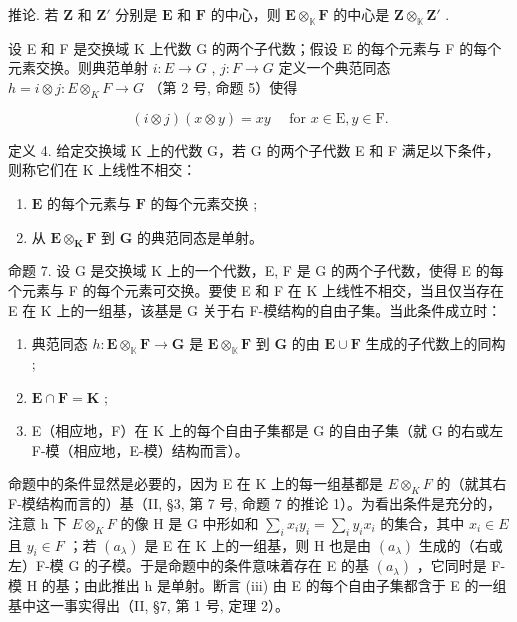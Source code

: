 推论. 若 \(\mathbf{Z}\) 和 \(\mathbf{Z}'\) 分别是 \(\mathbf{E}\) 和 \(\mathbf{F}\) 的中心，则 \(\mathbf{E} \otimes_{\mathbb{K}} \mathbf{F}\) 的中心是 \(\mathbf{Z} \otimes_{\mathbb{K}} \mathbf{Z}'\) .

设 E 和 F 是交换域 K 上代数 G 的两个子代数；假设 E 的每个元素与 F 的每个元素交换。则典范单射 \(i: E \to G\) , \(j: F \to G\) 定义一个典范同态 \(h = i \otimes j: E \otimes_{K} F \to G\) （第 2 号, 命题 5）使得

\[
(i \otimes j) (x \otimes y) = x y \quad \text { for } x \in \mathrm{E}, y \in \mathrm{F}.
\]

定义 4. 给定交换域 K 上的代数 G，若 G 的两个子代数 E 和 F 满足以下条件，则称它们在 K 上线性不相交：

\begin{enumerate}
\def\labelenumi{(\arabic{enumi})}
\item
  \(\mathbf{E}\) 的每个元素与 \(\mathbf{F}\) 的每个元素交换 ;
\item
  从 \(\mathbf{E} \otimes_{\mathbf{K}} \mathbf{F}\) 到 \(\mathbf{G}\) 的典范同态是单射。
\end{enumerate}

命题 7. 设 G 是交换域 K 上的一个代数，E, F 是 G 的两个子代数，使得 E 的每个元素与 F 的每个元素可交换。要使 E 和 F 在 K 上线性不相交，当且仅当存在 E 在 K 上的一组基，该基是 G 关于右 F-模结构的自由子集。当此条件成立时：

\begin{enumerate}
\def\labelenumi{(\roman{enumi})}
\item
  典范同态 \(h: \mathbf{E} \otimes_{\mathbb{K}} \mathbf{F} \to \mathbf{G}\) 是 \(\mathbf{E} \otimes_{\mathbb{K}} \mathbf{F}\) 到 \(\mathbf{G}\) 的由 \(\mathbf{E} \cup \mathbf{F}\) 生成的子代数上的同构 ;
\item
  \(\mathbf{E} \cap \mathbf{F} = \mathbf{K}\) ;
\item
  E（相应地，F）在 K 上的每个自由子集都是 G 的自由子集（就 G 的右或左 F-模（相应地，E-模）结构而言）。
\end{enumerate}

命题中的条件显然是必要的，因为 E 在 K 上的每一组基都是 \(E \otimes_{K} F\) 的（就其右 F-模结构而言的）基（II, §3, 第 7 号, 命题 7 的推论 1）。为看出条件是充分的，注意 h 下 \(E \otimes_{K} F\) 的像 H 是 G 中形如和 \(\sum_{i} x_{i} y_{i} = \sum_{i} y_{i} x_{i}\) 的集合，其中 \(x_{i} \in E\) 且 \(y_{i} \in F\) ；若 \((a_{\lambda})\) 是 E 在 K 上的一组基，则 H 也是由 \((a_{\lambda})\) 生成的（右或左）F-模 G 的子模。于是命题中的条件意味着存在 E 的基 \((a_{\lambda})\) ，它同时是 F-模 H 的基；由此推出 h 是单射。断言 (iii) 由 E 的每个自由子集都含于 E 的一组基中这一事实得出（II, §7, 第 1 号, 定理 2）。

